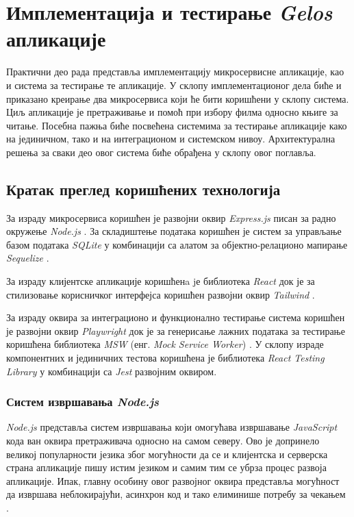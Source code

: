 \documentclass[12pt,oneside]{memoir}
\begin{document}
\chapter{Имплементација и тестирање \textit{Gelos} апликације}
\label{chp:aplikacija}
Практични део рада представља имплементацију микросервисне апликације, као и система за тестирање те апликације. У склопу имплементационог дела биће и приказано креирање два микросервиса који ће бити коришћени у склопу система. Циљ апликације је претраживање и помоћ при избору филма односно књиге за читање. Посебна пажња биће посвећена системима за тестирање апликације како на јединичном, тако и на интеграционом и системском нивоу. Архитектурална решења за сваки део овог система биће обрађена у склопу овог поглавља.

\section{Кратак преглед коришћених технологија}
\label{chp:tehnologije}

За израду микросервиса коришћен је развојни оквир \textit{Express.js} \cite{express} писан за радно окружење \textit{Node.js} \cite{nodejs}. За складиштење података коришћен је систем за управљање базом података \textit{SQLite} \cite{sqlite} у комбинацији са алатом за објектно-релационо мапирање \textit{Sequelize} \cite{sequelize}. 

За израду клијентске апликације коришћенa jе библиотека \textit{React} \cite{react} док је за стилизовање корисничког интерфејса коришћен развојни оквир \textit{Tailwind} \cite{tailwind}. 

За израду оквира за интеграционо и функционално тестирање система коришћен је развојни оквир \textit{Playwright} \cite{playwright} док је за генерисање лажних података за тестирање коришћена библиотека \textit{MSW} (енг. \textit{Mock Service Worker}) \cite{msw}. У склопу израде компонентних и јединичних тестова коришћена је библиотека \textit{React Testing Library} \cite{rtl} у комбинацији са \textit{Jest} \cite{jest} развојним оквиром.

\subsection{Систем извршавања \textit{Node.js}}

\textit{Node.js} представља систем извршавања који омогућава извршавање \textit{JavaScript} кода ван оквира претраживача односно на самом северу. Ово је допринело великој популарности језика због могућности да се и клијентска и серверска страна апликације пишу истим језиком и самим тим се убрза процес развоја апликације. 
Ипак, главну особину овог развојног оквира представља могућност да извршава неблокирајући, асинхрон код и тако елиминише потребу за чекањем  \cite{w3nodejs}.
\end{document}

